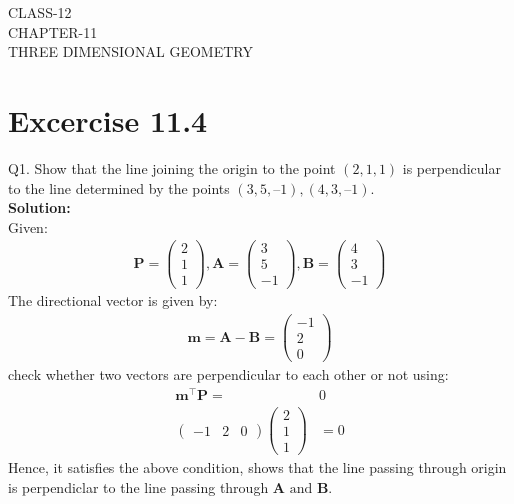 \documentclass[12pt]{article}
\newcommand{\solution}{\noindent \textbf{Solution: }}
\newcommand{\myvec}[1]{\ensuremath{\begin{pmatrix}#1\end{pmatrix}}}
\let\vec\mathbf
\begin{document}
\begin{center}
\textbf\large{CLASS-12 \\ CHAPTER-11 \\ THREE DIMENSIONAL GEOMETRY}
\end{center}
\section*{Excercise 11.4}

Q1. Show that the line joining the origin to the point $(2, 1, 1)$ is perpendicular to the
line determined by the points $(3, 5, – 1), (4, 3, – 1)$.
\\
\solution
\\
Given:
\begin{align}
  \vec{P}=\myvec{2\\1\\1},\vec{A}=\myvec{3\\5\\-1},\vec{B}=\myvec{4\\3\\-1}
\end{align}
The directional vector is given by:
		\begin{align}
	\vec{m}=\vec{A}-\vec{B}=\myvec{-1\\2\\0}
		\end{align}
			 check whether two vectors are perpendicular to each other or not using:
		\begin{align}
			\vec{m}^\top\vec{P}=&0\\
			\myvec{-1&2&0}\myvec{2\\1\\1}&=0
		\end{align}
				Hence, it satisfies the above condition, shows that the line passing through origin is perpendiclar to the line passing through $\vec{A} \text{ and } \vec{B}$.
		
\end{document}
